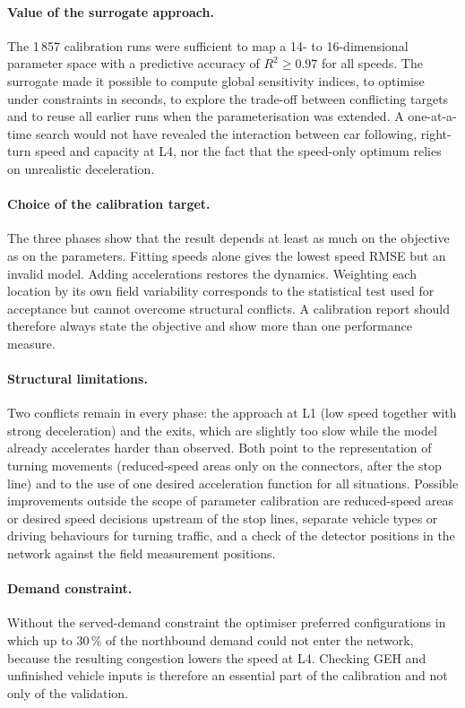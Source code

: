 \documentclass[11pt,a4paper]{article}
\begin{document}
\paragraph{Value of the surrogate approach.} The 1\,857 calibration runs were sufficient to map a 14- to
16-dimensional parameter space with a predictive accuracy of $R^2 \ge 0.97$ for all speeds. The
surrogate made it possible to compute global sensitivity indices, to optimise under constraints in
seconds, to explore the trade-off between conflicting targets and to reuse all earlier runs when
the parameterisation was extended. A one-at-a-time search would not have revealed the interaction
between car following, right-turn speed and capacity at L4, nor the fact that the speed-only
optimum relies on unrealistic deceleration.

\paragraph{Choice of the calibration target.} The three phases show that the result depends at least
as much on the objective as on the parameters. Fitting speeds alone gives the lowest speed RMSE but
an invalid model. Adding accelerations restores the dynamics. Weighting each location by its own
field variability corresponds to the statistical test used for acceptance but cannot overcome
structural conflicts. A calibration report should therefore always state the objective and show
more than one performance measure.

\paragraph{Structural limitations.} Two conflicts remain in every phase: the approach at L1 (low
speed together with strong deceleration) and the exits, which are slightly too slow while the model
already accelerates harder than observed. Both point to the representation of turning movements
(reduced-speed areas only on the connectors, after the stop line) and to the use of one desired
acceleration function for all situations. Possible improvements outside the scope of parameter
calibration are reduced-speed areas or desired speed decisions upstream of the stop lines, separate
vehicle types or driving behaviours for turning traffic, and a check of the detector positions in
the network against the field measurement positions.

\paragraph{Demand constraint.} Without the served-demand constraint the optimiser preferred
configurations in which up to 30\,\% of the northbound demand could not enter the network, because
the resulting congestion lowers the speed at L4. Checking GEH and unfinished vehicle inputs is
therefore an essential part of the calibration and not only of the validation.
\end{document}
